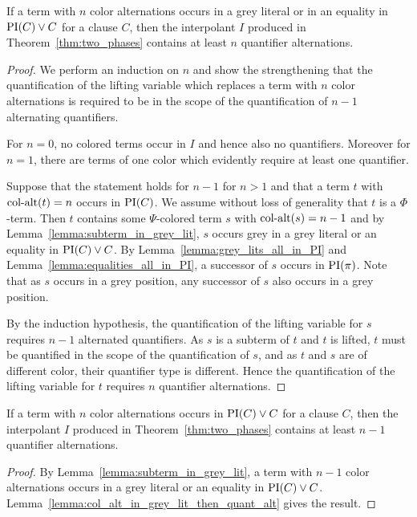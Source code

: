 \documentclass[,%
	draft=false,%
	numbers=noendperiod
	12pt,
	a4paper,
	oneside,%
	openany,
]{memoir}
\begin{document}
\begin{lemma}
	\label{lemma:col_alt_in_grey_lit_then_quant_alt}
	If a term with $n$ color alternations occurs in a grey literal or in an equality in $\operatorname{PI}(C) \lor C$ for a clause $C$, then the interpolant $I$ produced in Theorem~\ref{thm:two_phases} contains at least $n$ quantifier alternations.
\end{lemma}
\begin{proof}
	We perform an induction on $n$
	and show the strengthening that
	the quantification of the lifting variable which replaces a term with $n$ color alternations is required to be in the scope of the quantification of $n-1$ alternating quantifiers.

	For $n=0$, no colored terms occur in $I$ and hence also no quantifiers.
	Moreover for $n=1$, there are terms of one color which evidently require at least one quantifier.

	Suppose that the statement holds for $n-1$ for $n>1$ and that a term $t$ with $\operatorname{col-alt}(t) = n$ occurs in $\operatorname{PI}(C)$.
	We assume without loss of generality that $t$ is a $\Phi$-term.
	Then $t$ contains some $\Psi$-colored term $s$ with $\operatorname{col-alt}(s) = n-1$ and
	by Lemma~\ref{lemma:subterm_in_grey_lit}, $s$ occurs grey in a grey literal or an equality in $\operatorname{PI}(C) \lor C$.
	By Lemma~\ref{lemma:grey_lits_all_in_PI} and Lemma~\ref{lemma:equalities_all_in_PI}, a successor of $s$ occurs in $\operatorname{PI}(\pi)$. Note that as $s$ occurs in a grey position, any successor of $s$ also occurs in a grey position.

	By the induction hypothesis, the quantification of the lifting variable for $s$ requires $n-1$ alternated quantifiers.
	As $s$ is a subterm of $t$ and $t$ is lifted, $t$ must be quantified in the scope of the quantification of $s$, and as $t$ and $s$ are of different color, their quantifier type is different. 
	Hence the quantification of the lifting variable for $t$ requires $n$ quantifier alternations.
\end{proof}

\begin{prop}
	\label{prop:color_alt_eq_quant_alt}
	If a term with $n$ color alternations occurs in $\operatorname{PI}(C) \lor C$ for a clause $C$, then the interpolant $I$ produced in Theorem~\ref{thm:two_phases} contains at least $n-1$ quantifier alternations.
\end{prop}
\begin{proof}
	By Lemma~\ref{lemma:subterm_in_grey_lit}, a term with $n-1$ color alternations occurs in a grey literal or an equality in $\operatorname{PI}(C) \lor C$.
	Lemma~\ref{lemma:col_alt_in_grey_lit_then_quant_alt} gives the result.
\end{proof}
\end{document}
